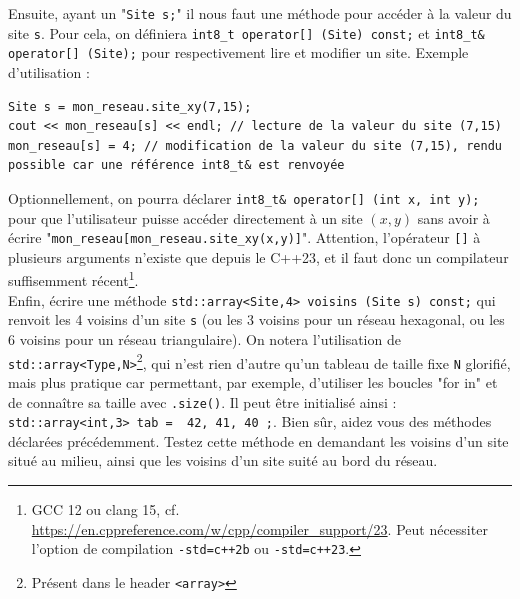 \documentclass{book}
\newcommand{\inline}[1]{\texttt{#1}}
\begin{document}
Ensuite, ayant un "\inline{Site s;}" il nous faut une méthode pour accéder à la valeur du site \inline{s}. Pour cela, on définiera \inline{int8_t operator[] (Site) const;} et \inline{int8_t& operator[] (Site);} pour respectivement lire et modifier un site. Exemple d'utilisation :
\begin{verbatim}
Site s = mon_reseau.site_xy(7,15);
cout << mon_reseau[s] << endl; // lecture de la valeur du site (7,15)
mon_reseau[s] = 4; // modification de la valeur du site (7,15), rendu possible car une référence int8_t& est renvoyée
\end{verbatim}
Optionnellement, on pourra déclarer \inline{int8_t& operator[] (int x, int y);} pour que l'utilisateur puisse accéder directement à un site $(x,y)$ sans avoir à écrire "\inline{mon_reseau[mon_reseau.site_xy(x,y)]}". Attention, l'opérateur \inline{[]} à plusieurs arguments n'existe que depuis le C++23, et il faut donc un compilateur suffisemment récent\footnote{GCC 12 ou clang 15, cf. \url{https://en.cppreference.com/w/cpp/compiler_support/23}. Peut nécessiter l'option de compilation \texttt{-std=c++2b} ou \texttt{-std=c++23}.}.\\

Enfin, écrire une méthode \inline{std::array<Site,4> voisins (Site s) const;} qui renvoit les 4 voisins d'un site \inline{s} (ou les 3 voisins pour un réseau hexagonal, ou les 6 voisins pour un réseau triangulaire). On notera l'utilisation de \inline{std::array<Type,N>}\footnote{Présent dans le header \texttt{<array>}}, qui n'est rien d'autre qu'un tableau de taille fixe \inline{N} glorifié, mais plus pratique car permettant, par exemple, d'utiliser les boucles "for in" et de connaître sa taille avec \inline{.size()}. Il peut être initialisé ainsi : \inline{std::array<int,3> tab = { 42, 41, 40 };}. Bien sûr, aidez vous des méthodes déclarées précédemment. Testez cette méthode en demandant les voisins d'un site situé au milieu, ainsi que les voisins d'un site suité au bord du réseau.\\
\end{document}
